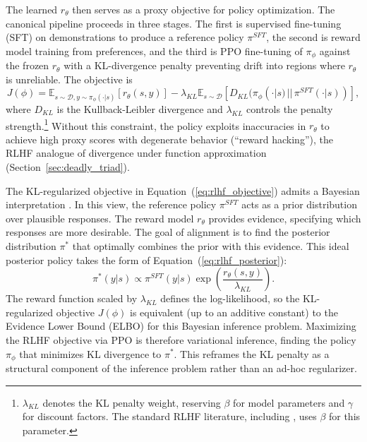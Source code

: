 The learned $r_\theta$ then serves as a proxy objective for policy optimization. The canonical pipeline \citep{ouyang2022training} proceeds in three stages. The first is supervised fine-tuning (SFT) on demonstrations to produce a reference policy $\pi^{SFT}$, the second is reward model training from preferences, and the third is PPO fine-tuning of $\pi_\phi$ against the frozen $r_\theta$ with a KL-divergence penalty preventing drift into regions where $r_\theta$ is unreliable. The objective is
\begin{equation}
    J(\phi) = \mathbb{E}_{s \sim \mathcal{D}, y \sim \pi_\phi(\cdot|s)} [r_\theta(s, y)] - \lambda_{KL} \mathbb{E}_{s \sim \mathcal{D}} [D_{KL}(\pi_\phi(\cdot|s) \,||\, \pi^{SFT}(\cdot|s))],
\label{eq:rlhf_objective}
\end{equation}
where $D_{KL}$ is the Kullback-Leibler divergence and $\lambda_{KL}$ controls the penalty strength.\footnote{$\lambda_{KL}$ denotes the KL penalty weight, reserving $\beta$ for model parameters and $\gamma$ for discount factors. The standard RLHF literature, including \citet{rafailov2023direct}, uses $\beta$ for this parameter.} Without this constraint, the policy exploits inaccuracies in $r_\theta$ to achieve high proxy scores with degenerate behavior (``reward hacking''), the RLHF analogue of divergence under function approximation (Section~\ref{sec:deadly_triad}).

The KL-regularized objective in Equation~(\ref{eq:rlhf_objective}) admits a Bayesian interpretation \citep{korbak2022rl}. In this view, the reference policy $\pi^{SFT}$ acts as a prior distribution over plausible responses. The reward model $r_\theta$ provides evidence, specifying which responses are more desirable. The goal of alignment is to find the posterior distribution $\pi^*$ that optimally combines the prior with this evidence. This ideal posterior policy takes the form of Equation~(\ref{eq:rlhf_posterior}):
\begin{equation}
    \pi^*(y|s) \propto \pi^{SFT}(y|s) \exp\left(\frac{r_\theta(s, y)}{\lambda_{KL}}\right).
\label{eq:rlhf_posterior}
\end{equation}
The reward function scaled by $\lambda_{KL}$ defines the log-likelihood, so the KL-regularized objective $J(\phi)$ is equivalent (up to an additive constant) to the Evidence Lower Bound (ELBO) for this Bayesian inference problem. Maximizing the RLHF objective via PPO is therefore variational inference, finding the policy $\pi_\phi$ that minimizes KL divergence to $\pi^*$. This reframes the KL penalty as a structural component of the inference problem rather than an ad-hoc regularizer.

